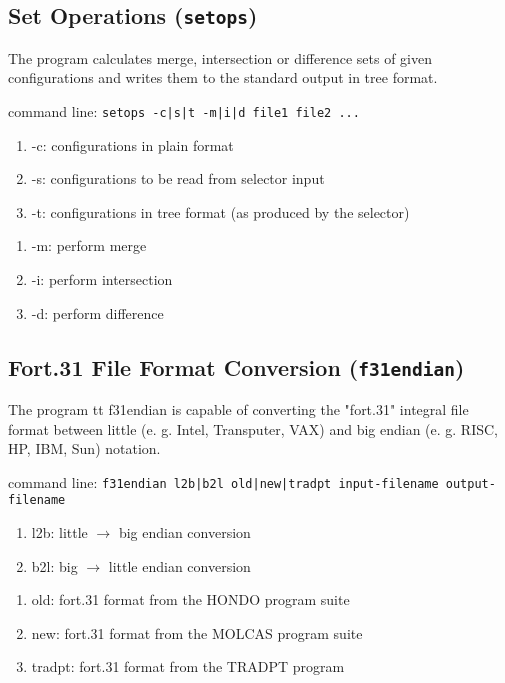 \subsection{Set Operations ({\tt setops})}
The program calculates merge, intersection or difference sets
of given configurations and writes them to the standard output
in tree format.

\bigskip
command line:
{\tt setops -{c|s|t} -{m|i|d} file1 file2 ...}

\begin{enumerate}
\item -c: configurations in plain format
\item -s: configurations to be read from selector input
\item -t: configurations in tree format (as produced by the selector)
\end{enumerate}

\begin{enumerate}
\item -m: perform merge
\item -i: perform intersection
\item -d: perform difference
\end{enumerate}


\subsection{Fort.31 File Format Conversion ({\tt f31endian})}
The program {tt f31endian} is capable of converting the "fort.31" integral file
format between little (e. g. Intel, Transputer, VAX) and 
big endian (e. g. RISC, HP, IBM, Sun) notation.

command line:
{\tt f31endian {l2b|b2l} {old|new|tradpt} input-filename output-filename}

\begin{enumerate}
\item l2b: little $\to$ big endian conversion
\item b2l: big $\to$ little endian conversion
\end{enumerate}

\begin{enumerate}
\item old: fort.31 format from the HONDO program suite
\item new: fort.31 format from the MOLCAS program suite
\item tradpt: fort.31 format from the TRADPT program
\end{enumerate}



